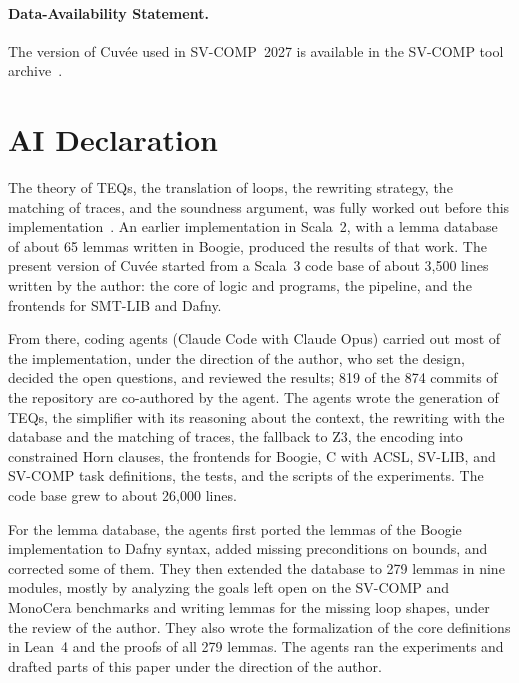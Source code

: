 \documentclass[runningheads]{llncs}
\newcommand{\cuvee}{Cuvée}
\begin{document}
\paragraph{Data-Availability Statement.}
The version of \cuvee{} used in SV-COMP~2027 is available in the SV-COMP tool archive~\cite{cuvee-artifact}.

\section*{AI Declaration}

The theory of \acp{TEQ}, the translation of loops, the rewriting strategy, the matching of
traces, and the soundness argument, was fully worked out before this implementation~\cite{teq}. An
earlier implementation in Scala~2, with a lemma database of about 65 lemmas written in Boogie, produced
the results of that work. The present version of \cuvee{} started from a Scala~3 code base of about
3{,}500 lines written by the author: the core of logic and programs, the pipeline, and the frontends for
SMT-LIB and Dafny.

From there, coding agents (Claude Code with Claude Opus) carried out most of the implementation, under
the direction of the author, who set the design, decided the open questions, and reviewed the results;
819 of the 874 commits of the repository are co-authored by the agent. The agents wrote the generation of
\acp{TEQ}, the simplifier with its reasoning about the context, the rewriting with the database
and the matching of traces, the fallback to Z3, the encoding into constrained Horn clauses, the frontends
for Boogie, C with ACSL, SV-LIB, and SV-COMP task definitions, the tests, and the scripts of the
experiments. The code base grew to about 26{,}000 lines.

For the lemma database, the agents first ported the lemmas of the Boogie implementation to Dafny syntax,
added missing preconditions on bounds, and corrected some of them. They then extended the database to 279
lemmas in nine modules, mostly by analyzing the goals left open on the SV-COMP and MonoCera benchmarks
and writing lemmas for the missing loop shapes, under the review of the author. They also wrote the
formalization of the core definitions in Lean~4 and the proofs of all 279 lemmas.
The agents ran the experiments and drafted parts of this paper under the direction of the author.



\end{document}
